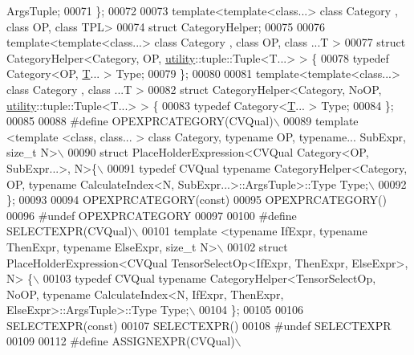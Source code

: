 \begin{DoxyCode}
       ArgsTuple;
00071 \};
00072 
00073 \textcolor{keyword}{template}<\textcolor{keyword}{template}<\textcolor{keyword}{class}...> \textcolor{keyword}{class }Category , \textcolor{keyword}{class }OP, \textcolor{keyword}{class }TPL>
00074 \textcolor{keyword}{struct }CategoryHelper;
00075 
00076 \textcolor{keyword}{template}<\textcolor{keyword}{template}<\textcolor{keyword}{class}...> \textcolor{keyword}{class }Category , \textcolor{keyword}{class }OP, \textcolor{keyword}{class }...T >
00077 \textcolor{keyword}{struct }CategoryHelper<Category, OP, \hyperlink{namespaceutility}{utility}::tuple::Tuple<T...> > \{
00078   \textcolor{keyword}{typedef} Category<OP, \hyperlink{group___sparse_core___module_class_eigen_1_1_triplet}{T}... > Type;
00079 \};
00080 
00081 \textcolor{keyword}{template}<\textcolor{keyword}{template}<\textcolor{keyword}{class}...> \textcolor{keyword}{class }Category , \textcolor{keyword}{class }...T >
00082 \textcolor{keyword}{struct }CategoryHelper<Category, NoOP, \hyperlink{namespaceutility}{utility}::tuple::Tuple<T...> > \{
00083   \textcolor{keyword}{typedef} Category<\hyperlink{group___sparse_core___module_class_eigen_1_1_triplet}{T}... > Type;
00084 \};
00085 
00088 \textcolor{preprocessor}{#define OPEXPRCATEGORY(CVQual)\(\backslash\)}
00089 \textcolor{preprocessor}{template <template <class, class... > class Category, typename OP, typename... SubExpr, size\_t N>\(\backslash\)}
00090 \textcolor{preprocessor}{struct PlaceHolderExpression<CVQual Category<OP, SubExpr...>, N>\{\(\backslash\)}
00091 \textcolor{preprocessor}{  typedef CVQual typename CategoryHelper<Category, OP, typename CalculateIndex<N,
       SubExpr...>::ArgsTuple>::Type Type;\(\backslash\)}
00092 \textcolor{preprocessor}{\};}
00093 
00094 OPEXPRCATEGORY(\textcolor{keyword}{const})
00095 OPEXPRCATEGORY()
00096 \textcolor{preprocessor}{#undef OPEXPRCATEGORY}
00097 
00100 \textcolor{preprocessor}{#define SELECTEXPR(CVQual)\(\backslash\)}
00101 \textcolor{preprocessor}{template <typename IfExpr, typename ThenExpr, typename ElseExpr, size\_t N>\(\backslash\)}
00102 \textcolor{preprocessor}{struct PlaceHolderExpression<CVQual TensorSelectOp<IfExpr, ThenExpr, ElseExpr>, N> \{\(\backslash\)}
00103 \textcolor{preprocessor}{  typedef CVQual typename CategoryHelper<TensorSelectOp, NoOP, typename CalculateIndex<N, IfExpr, ThenExpr,
       ElseExpr>::ArgsTuple>::Type Type;\(\backslash\)}
00104 \textcolor{preprocessor}{\};}
00105 
00106 SELECTEXPR(\textcolor{keyword}{const})
00107 SELECTEXPR()
00108 \textcolor{preprocessor}{#undef SELECTEXPR}
00109 
00112 \textcolor{preprocessor}{#define ASSIGNEXPR(CVQual)\(\backslash\)}

\end{DoxyCode}
